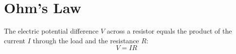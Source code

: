 \section{Ohm's Law}
The electric potential difference $V$ across a resistor equals the product of
the current $I$ through the load and the resistance $R$:
\begin{equation}
  \boxed{V=IR}
\end{equation}
%
%
%
%
%
%
%
%
%
%
%
%
%
%  

